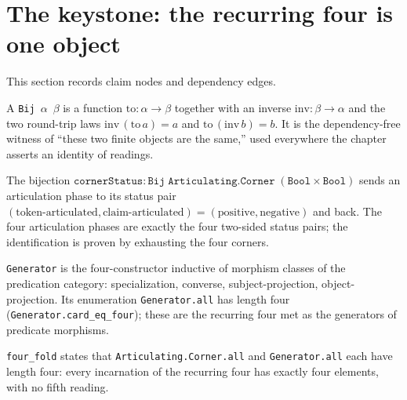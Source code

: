 \section{The keystone: the recurring four is one object}

This section records claim nodes and dependency edges.

\begin{proposition}\label{thm:bij}\leanok{}
A \texttt{Bij}~$\alpha$~$\beta$ is a function $\mathrm{to} : \alpha \to \beta$ together with an inverse $\mathrm{inv} : \beta \to \alpha$ and the two round-trip laws $\mathrm{inv}\,(\mathrm{to}\,a) = a$ and $\mathrm{to}\,(\mathrm{inv}\,b) = b$. It is the dependency-free witness of ``these two finite objects are the same,'' used everywhere the chapter asserts an identity of readings.
\end{proposition}
\begin{proposition}\label{thm:corner-status}\leanok{}
The bijection $\texttt{cornerStatus} : \texttt{Bij}\;\texttt{Articulating.Corner}\;(\texttt{Bool} \times \texttt{Bool})$ sends an articulation phase to its status pair $(\text{token-articulated}, \text{claim-articulated}) = (\text{positive}, \text{negative})$ and back. The four articulation phases are exactly the four two-sided status pairs; the identification is proven by exhausting the four corners.
\end{proposition}
\begin{proposition}\label{thm:generator}\leanok{}
\texttt{Generator} is the four-constructor inductive of morphism classes of the predication category: specialization, converse, subject-projection, object-projection. Its enumeration \texttt{Generator.all} has length four (\texttt{Generator.card\_eq\_four}); these are the recurring four met as the generators of predicate morphisms.
\end{proposition}
\begin{proposition}\label{thm:four-fold}\leanok{}
\texttt{four\_fold} states that \texttt{Articulating.Corner.all} and \texttt{Generator.all} each have length four: every incarnation of the recurring four has exactly four elements, with no fifth reading.
\end{proposition}
